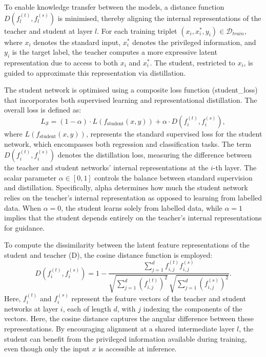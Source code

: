 To enable knowledge transfer between the models, a distance function \( D(f_l^{(t)}, f_l^{(s)}) \) is minimised, thereby aligning the internal representations of the teacher and student at layer \( l \). For each training triplet \( (x_i, x_i^*, y_i) \in \mathcal{D}_{train} \), where \( x_i \) denotes the standard input, \( x_i^* \) denotes the privileged information, and \( y_i \) is the target label, the teacher computes a more expressive latent representation due to access to both \( x_i \) and \( x_i^* \). The student, restricted to \( x_i \), is guided to approximate this representation via distillation.

The student network is optimised using a composite loss function (\gls{student_loss}) that incorporates both supervised learning and representational distillation. The overall loss is defined as:
\begin{equation} \label{eq:lupi_loss_function}
L_{\mathcal{S}} = (1 - \alpha) \cdot L(f_{\text{student}}(x, y)) + \alpha \cdot D(f_i^{(t)}, f_i^{(s)}),
\end{equation}
where \( L(f_{\text{student}}(x, y)) \), represents the standard supervised loss for the student network, which encompasses both regression and classification tasks. The term \( D(f_i^{(t)}, f_i^{(s)}) \) denotes the distillation loss, measuring the difference between the teacher and student networks' internal representations at the \( i \)-th layer. The scalar parameter \( \alpha \in [0, 1] \) controls the balance between standard supervision and distillation. Specifically, \gls{alpha} determines how much the student network relies on the teacher’s internal representation as opposed to learning from labelled data. When \( \alpha = 0 \), the student learns solely from labelled data, while \( \alpha = 1 \) implies that the student depends entirely on the teacher's internal representations for guidance.

To compute the dissimilarity between the latent feature representations of the student and teacher (\gls{D}), the cosine distance function is employed:
\begin{equation} \label{eq:cosine_distance}
D(f_i^{(t)}, f_i^{(s)}) = 1 - \frac{\sum_{j=1}^{d} f_{i,j}^{(t)} f_{i,j}^{(s)}}{\sqrt{\sum_{j=1}^{d} (f_{i,j}^{(t)})^2} \, \sqrt{\sum_{j=1}^{d} (f_{i,j}^{(s)})^2}}.
\end{equation}
Here, \( f_i^{(t)} \) and \( f_i^{(s)} \) represent the feature vectors of the teacher and student networks at layer \( i \), each of length \( d \), with \( j \) indexing the components of the vectors. Here, the cosine distance captures the angular difference between these representations. By encouraging alignment at a shared intermediate layer \( l \), the student can benefit from the privileged information available during training, even though only the input \( x \) is accessible at inference.

